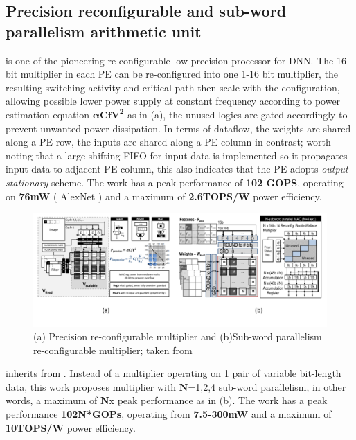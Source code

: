 \subsection{Precision reconfigurable and sub-word parallelism arithmetic unit}
\cite{PrecisionScalableVLSI} is one of the pioneering re-configurable low-precision processor for DNN. The 16-bit multiplier in each PE can be re-configured into one 1-16 bit multiplier, the resulting switching activity and critical path then scale with the configuration, allowing possible lower power supply at constant frequency according to power estimation equation $\boldsymbol{\alpha CfV^2}$ as in  (a), the unused logics are gated accordingly to prevent unwanted power dissipation. In terms of dataflow, the weights are shared along a PE row, the inputs are shared along a PE column in contrast; worth noting that a large shifting FIFO for input data is implemented so it propagates input data to adjacent PE column, this also indicates that the PE adopts \textit{output stationary} scheme. The work has a peak performance of \textbf{102 GOPS}, operating on \textbf{76mW} ( AlexNet ) and a maximum of \textbf{2.6TOPS/W} power efficiency. \\
\begin{figure}[t]
    \centering
    \includegraphics[width=1\linewidth]{inc/2_related_work/figure/precision_scalable_envision.png}
    \caption{(a) Precision re-configurable multiplier and (b)Sub-word parallelism re-configurable multiplier; taken from \cite{PrecisionScalableVLSI}\cite{ENVISION} }
    \label{fig:pre_scal_envi}
\end{figure}
\cite{ENVISION} inherits from \cite{PrecisionScalableVLSI}. Instead of a multiplier operating on 1 pair of variable bit-length data, this work proposes multiplier with $\boldsymbol{N}$=1,2,4 sub-word parallelism, in other words, a maximum of $\boldsymbol{N}$x peak performance as in  (b). The work has a peak performance \textbf{102N*GOPs}, operating from \textbf{7.5-300mW} and a maximum of \textbf{10TOPS/W} power efficiency. \\

